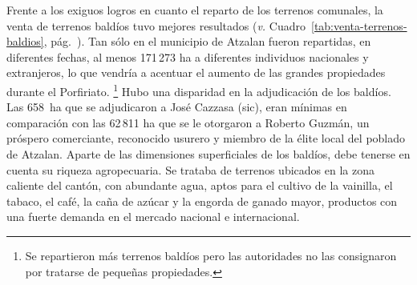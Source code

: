 \documentclass[14pt,twoside,final]{extbook} %
\let\oldfootnote\footnote
\renewcommand\footnote[1]{%
\oldfootnote{\hspace{1mm}#1}}
\begin{document}
Frente a los exiguos logros en cuanto el reparto de los terrenos comunales, la venta de terrenos baldíos tuvo mejores resultados (\emph{v.} Cuadro~\ref{tab:venta-terrenos-baldios}, pág.~\pageref{tab:venta-terrenos-baldios}). Tan sólo en el municipio de Atzalan fueron repartidas, en diferentes fechas, al menos 171\,273 ha a diferentes individuos nacionales y extranjeros, lo que vendría a acentuar el aumento de las grandes propiedades durante el Porfiriato.\footnote{Se repartieron más terrenos baldíos pero las autoridades no las consignaron por tratarse de pequeñas propiedades.} Hubo una disparidad en la adjudicación de los baldíos. Las 658~ha que se adjudicaron a José Cazzasa (sic), eran mínimas en comparación con las 62\,811 ha que se le otorgaron a Roberto Guzmán, un próspero comerciante, reconocido usurero y miembro de la élite local del poblado de Atzalan. Aparte de las dimensiones superficiales de los baldíos, debe tenerse en cuenta su riqueza agropecuaria. Se trataba de terrenos ubicados en la zona caliente del cantón, con abundante agua, aptos para el cultivo de la vainilla, el tabaco, el café, la caña de azúcar y la engorda de ganado mayor, productos con una fuerte demanda en el mercado nacional e internacional.
\end{document}
